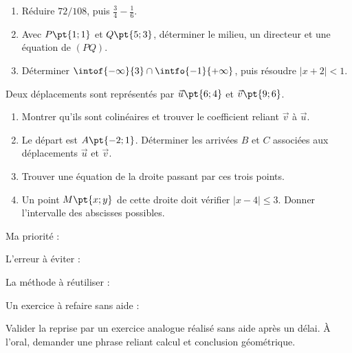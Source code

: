 \begin{example}\begin{enumerate}
\item Réduire $72/108$, puis $\frac34-\frac16$.
\item Avec $P\pt{1;1}$ et $Q\pt{5;3}$, déterminer le milieu, un directeur et une équation de $(PQ)$.
\item Déterminer $\intof{-\infty}{3}\cap\intfo{-1}{+\infty}$, puis résoudre $|x+2|<1$.
\end{enumerate}\end{example}
\begin{example}Deux déplacements sont représentés par $\vec u\pt{6;4}$ et $\vec v\pt{9;6}$.
\begin{enumerate}\item Montrer qu'ils sont colinéaires et trouver le coefficient reliant $\vec v$ à $\vec u$.
\item Le départ est $A\pt{-2;1}$. Déterminer les arrivées $B$ et $C$ associées aux déplacements $\vec u$ et $\vec v$.
\item Trouver une équation de la droite passant par ces trois points.
\item Un point $M\pt{x;y}$ de cette droite doit vérifier $|x-4|\leq3$. Donner l'intervalle des abscisses possibles.
\end{enumerate}\end{example}
\begin{keypoint}
Ma priorité : \dotfill\par L'erreur à éviter : \dotfill\par La méthode à réutiliser : \dotfill\par Un exercice à refaire sans aide : \dotfill
\end{keypoint}
\begin{teachernote}Valider la reprise par un exercice analogue réalisé sans aide après un délai. À l'oral, demander une phrase reliant calcul et conclusion géométrique.\end{teachernote}
